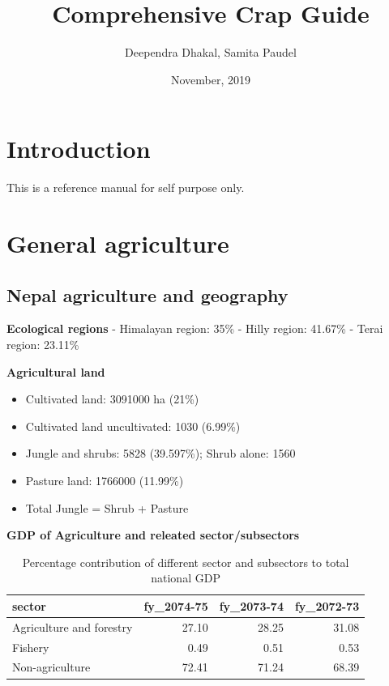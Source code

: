 \documentclass[
]{book}
\title{Comprehensive Crap Guide}
\author{Deependra Dhakal, Samita Paudel}
\date{November, 2019}
\providecommand{\tightlist}{%
  \setlength{\itemsep}{0pt}\setlength{\parskip}{0pt}}
\begin{document}
\maketitle

{
\setcounter{tocdepth}{1}
\tableofcontents
}
\hypertarget{introduction}{%
\chapter{Introduction}\label{introduction}}

This is a reference manual for self purpose only.

\hypertarget{general-agriculture}{%
\chapter{General agriculture}\label{general-agriculture}}

\hypertarget{nepal-agriculture-and-geography}{%
\section{Nepal agriculture and geography}\label{nepal-agriculture-and-geography}}

\textbf{Ecological regions}
- Himalayan region: 35\%
- Hilly region: 41.67\%
- Terai region: 23.11\%

\textbf{Agricultural land}

\begin{itemize}
\tightlist
\item
  Cultivated land: 3091000 ha (21\%)
\item
  Cultivated land uncultivated: 1030 (6.99\%)
\item
  Jungle and shrubs: 5828 (39.597\%); Shrub alone: 1560
\item
  Pasture land: 1766000 (11.99\%)
\item
  Total Jungle = Shrub + Pasture
\end{itemize}

\textbf{GDP of Agriculture and releated sector/subsectors}

\begin{table}

\caption{\label{tab:unnamed-chunk-2}Percentage contribution of different sector and subsectors to total national GDP}
\centering
\begin{tabular}[t]{lrrr}
\toprule
sector & fy\_2074-75 & fy\_2073-74 & fy\_2072-73\\
\midrule
Agriculture and forestry & 27.10 & 28.25 & 31.08\\
Fishery & 0.49 & 0.51 & 0.53\\
Non-agriculture & 72.41 & 71.24 & 68.39\\
\bottomrule
\end{tabular}
\end{table}
\end{document}
